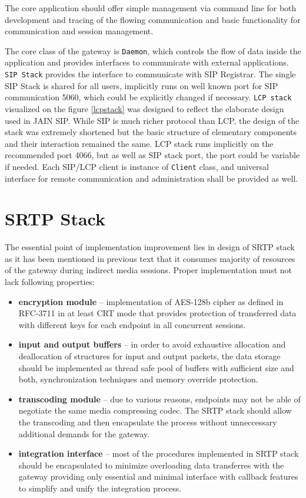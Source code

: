 The core application should offer simple management via command line for 
both development and tracing of the flowing communication and basic functionality
for communication and session management. 

The core class of the gateway is \texttt{Daemon}, which controls the flow of data inside 
the application and provides interfaces to communicate with external 
applications.
\texttt{SIP Stack} provides the interface to communicate with SIP Registrar. 
The single SIP Stack is shared for all users, implicitly runs on well known port
for SIP communication 5060, which could be explicitly changed if necessary.
\texttt{LCP stack} visualized on the figure \ref{lcpstack} was designed to reflect
the elaborate design used in JAIN SIP\cite{jainsip}. While SIP is much richer 
protocol than LCP, the design of the stack was extremely shortened but the basic
structure of elementary components and their interaction remained the same. LCP 
stack runs implicitly on the recommended port 4066, but as well as SIP stack 
port, the port could be variable if needed.
Each SIP/LCP client is instance of \texttt{Client} class, and universal interface for 
remote communication and administration shall be provided as well.


\section{SRTP Stack}
The essential point of implementation improvement lies in design of SRTP stack as
it has been mentioned in previous text that it consumes majority of resources of
the gateway during indirect media sessions. Proper implementation must not lack
following properties:

\begin{itemize}
\item \textbf{encryption module} -- implementation of AES-128b cipher as defined
in RFC-3711 \cite{rfc3711} in at least CRT mode that provides protection of transferred
data with different keys for each endpoint in all concurrent sessions.
\item \textbf{input and output buffers} -- in order to avoid exhaustive allocation
and deallocation of structures for input and output packets, the data storage should
be implemented as thread safe pool of buffers  with sufficient size and both, 
synchronization techniques and memory override protection.
\item \textbf{transcoding module} -- due to various reasons, endpoints may not be
able of negotiate the same media compressing codec. The SRTP stack should allow
the transcoding and then encapsulate the process without unneccessary additional
demands for the gateway.
\item \textbf{integration interface} -- most of the procedures implemented in
SRTP stack should be encapsulated to minimize overloading data transferres with
the gateway providing only essential and minimal interface with callback
features to simplify and unify the integration process.
\end{itemize}

